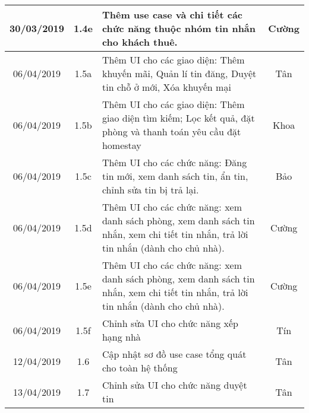 \begin{center}
\begin{longtable}{ | c | c | p{5cm} |c|}
		30/03/2019 & 1.4e & Thêm use case và chi tiết các chức năng thuộc nhóm tin nhắn cho khách thuê. & Cường \\ \hline
		
		06/04/2019 & 1.5a & Thêm UI cho các giao diện: Thêm khuyến mãi, Quản lí tin đăng, Duyệt tin chỗ ở mới, Xóa khuyến mại & Tân \\ \hline 
		06/04/2019 & 1.5b & Thêm UI cho các giao diện: Thêm giao diện tìm kiếm; Lọc kết quả, đặt phòng và thanh toán yêu cầu đặt homestay & Khoa \\ \hline
		06/04/2019 & 1.5c & Thêm UI cho các chức năng: Đăng tin mới, xem danh sách tin, ẩn tin, chỉnh sửa tin bị trả lại. & Bảo \\ \hline
		06/04/2019 & 1.5d & Thêm UI cho các chức năng: xem danh sách phòng, xem danh sách tin nhắn, xem chi tiết tin nhắn, trả lời tin nhắn (dành cho chủ nhà). & Cường \\ \hline
		06/04/2019 & 1.5e & Thêm UI cho các chức năng: xem danh sách phòng, xem danh sách tin nhắn, xem chi tiết tin nhắn, trả lời tin nhắn (dành cho chủ nhà). & Cường \\ \hline
		06/04/2019 & 1.5f & Chỉnh sửa UI cho chức năng xếp hạng nhà & Tín \\ \hline
		12/04/2019 & 1.6 & Cập nhật sơ đồ use case tổng quát cho toàn hệ thống & Tân \\ \hline
		13/04/2019 & 1.7 & Chỉnh sửa UI cho chức năng duyệt tin & Tân \\ \hline
		\end{longtable}
\end{center}